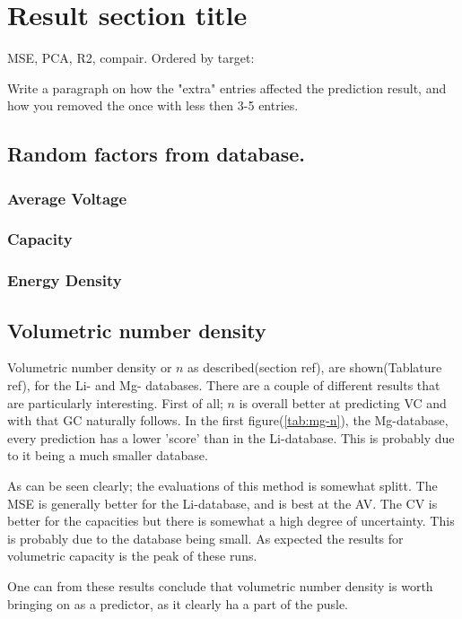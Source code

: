 \section{Result section title}
MSE, PCA, R2, compair.
Ordered by target:
 
 
 Write a paragraph on how the "extra" entries affected the prediction result, and how you removed the once with less then 3-5 entries.
 
  
\subsection{Random factors from database.}
\subsubsection{Average Voltage}
\subsubsection{Capacity}
\subsubsection{Energy Density}



\subsection{Volumetric number density}
Volumetric number density or $n$ as described(section ref), are shown(Tablature ref), for the Li- and Mg- databases. There are a couple of different results that are particularly interesting. First of all; $n$ is overall better at predicting VC and with that  GC naturally follows. In the first figure(\ref{tab:mg-n}), the Mg-database, every prediction has a lower 'score' than in the Li-database. This is probably due to it being a much smaller database. 


As can be seen clearly; the evaluations of this method is somewhat splitt. The MSE is generally better for the Li-database, and is best at the AV. The CV is better for the capacities but there is somewhat a high degree of uncertainty. This is probably due to the database being small. As expected the results for volumetric capacity is the peak of these runs. 

One can from these results conclude that volumetric number density is worth bringing on as a predictor, as it clearly ha a part of the pusle.  

